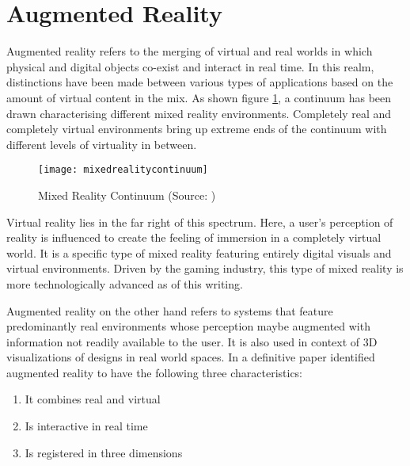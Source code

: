 \section{Augmented Reality}
\label{sec:augreal}
Augmented reality refers to the merging of virtual and real worlds in which physical and digital objects co-exist and interact in real time. In this realm, distinctions have been made between various types of applications based on the amount of virtual content in the mix. As shown figure \ref{fig:mixedrealitycontinuum}, a continuum has been drawn characterising different mixed reality environments. Completely real and completely virtual environments bring up extreme ends of the continuum with different levels of virtuality in between. 

\begin{figure}
	\centering
	\texttt{[image: mixedrealitycontinuum]}
	\caption{Mixed Reality Continuum (Source: \cite{milgram1995augmented})}
	\label{fig:mixedrealitycontinuum}
\end{figure}

Virtual reality lies in the far right of this spectrum. Here, a user's perception of reality is influenced to create the feeling of immersion in a completely virtual world. It is a specific type of mixed reality featuring entirely digital visuals and virtual environments. Driven by the gaming industry, this type of mixed reality is more technologically advanced as of this writing.

 Augmented reality on the other hand refers to systems that feature predominantly real environments whose perception maybe augmented with information not readily available to the user. It is also used in context of 3D visualizations of designs in real world spaces. In a definitive paper \textcite{azuma1997survey} identified augmented reality to have the following three characteristics: 
\begin{enumerate}
	\item It combines real and virtual 
	\item Is interactive in real time
	\item Is registered in three dimensions
\end{enumerate} 



